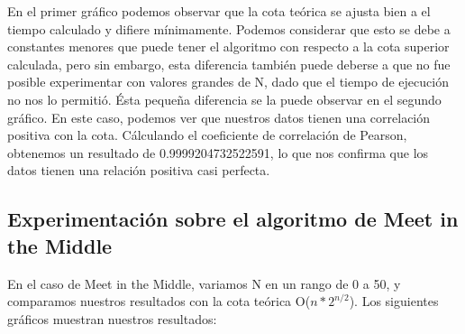 En el primer gráfico podemos observar que la cota teórica se ajusta bien a el tiempo calculado y difiere mínimamente. Podemos considerar que esto se debe a constantes menores que puede tener el algoritmo con respecto a la cota superior calculada, pero sin embargo, esta diferencia también puede deberse a que no fue posible experimentar con valores grandes de N, dado que el tiempo de ejecución no nos lo permitió.
\newline
Ésta pequeña diferencia se la puede observar en el segundo gráfico. En este caso, podemos ver que nuestros datos tienen una correlación positiva con la cota. Cálculando el coeficiente de correlación de Pearson, obtenemos un resultado de 0.9999204732522591, lo que nos confirma que los datos tienen una relación positiva casi perfecta.

\subsection{Experimentación sobre el algoritmo de Meet in the Middle}

En el caso de Meet in the Middle, variamos N en un rango de 0 a 50, y comparamos nuestros resultados con la cota teórica O($n*2^{n/2}$). Los siguientes gráficos muestran nuestros resultados:

